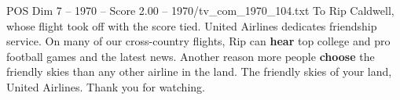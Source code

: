 \begin{textsample}{POS Dim 7 – 1970 – Score 2.00 – 1970/tv\_com\_1970\_104.txt}  \label{ex:f7_pos_035}
To Rip Caldwell, whose flight took off with the score tied.
United Airlines dedicates friendship service.
On many of our cross-country flights, Rip can \textbf{hear} top college and pro football games and the latest news.
Another reason more people \textbf{choose} the friendly skies than any other airline in the land.
The friendly skies of your land, United Airlines.
Thank you for watching.

\end{textsample}
